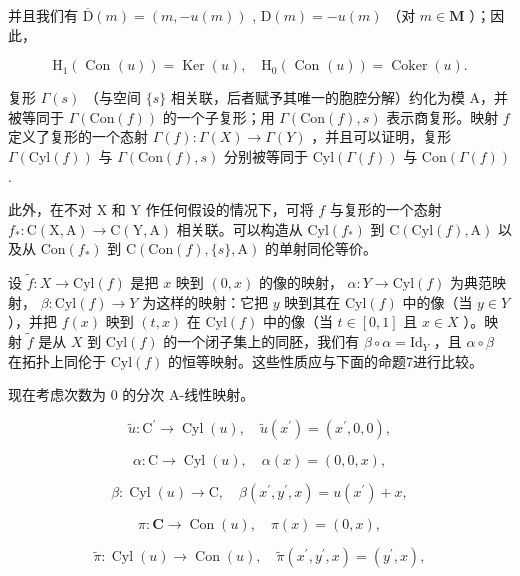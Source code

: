 并且我们有 \(\overline{\mathrm{D}}(m) = (m, -u(m))\) , \(\mathrm{D}(m) = -u(m)\) （对 \(m \in \mathbf{M}\) ）；因此，

\[
\mathrm{H} _ {1} (\text { Con } (u)) = \operatorname{Ker} (u), \quad \mathrm{H} _ {0} (\text { Con } (u)) = \operatorname{Coker} (u).
\]

复形 \(\Gamma(s)\) （与空间 \(\{s\}\) 相关联，后者赋予其唯一的胞腔分解）约化为模 A，并被等同于 \(\Gamma(\text{Con}(f))\) 的一个子复形；用 \(\Gamma(\text{Con}(f), s)\) 表示商复形。映射 \(f\) 定义了复形的一个态射 \(\Gamma(f): \Gamma(X) \to \Gamma(Y)\) ，并且可以证明，复形 \(\Gamma(\text{Cyl}(f))\) 与 \(\Gamma(\text{Con}(f), s)\) 分别被等同于 \(\text{Cyl}(\Gamma(f))\) 与 \(\text{Con}(\Gamma(f))\) .

此外，在不对 X 和 Y 作任何假设的情况下，可将 \(f\) 与复形的一个态射 \(f_{*}: \mathrm{C}(\mathrm{X}, \mathrm{A}) \to \mathrm{C}(\mathrm{Y}, \mathrm{A})\) 相关联。可以构造从 \(\mathrm{Cyl}(f_{*})\) 到 \(\mathrm{C}(\mathrm{Cyl}(f), \mathrm{A})\) 以及从 \(\mathrm{Con}(f_{*})\) 到 \(\mathrm{C}(\mathrm{Con}(f), \{s\}, \mathrm{A})\) 的单射同伦等价。

设 \(\tilde{f}: X \to \text{Cyl}(f)\) 是把 \(x\) 映到 \((0, x)\) 的像的映射， \(\alpha: Y \to \text{Cyl}(f)\) 为典范映射， \(\beta: \text{Cyl}(f) \to Y\) 为这样的映射：它把 \(y\) 映到其在 \(\text{Cyl}(f)\) 中的像（当 \(y \in Y\) ），并把 \(f(x)\) 映到 \((t, x)\) 在 \(\text{Cyl}(f)\) 中的像（当 \(t \in [0, 1]\) 且 \(x \in X\) ）。映射 \(\tilde{f}\) 是从 \(X\) 到 \(\text{Cyl}(f)\) 的一个闭子集上的同胚，我们有 \(\beta \circ \alpha = \text{Id}_Y\) ，且 \(\alpha \circ \beta\) 在拓扑上同伦于 \(\text{Cyl}(f)\) 的恒等映射。这些性质应与下面的命题7进行比较。

现在考虑次数为 0 的分次 A-线性映射。

\[
\tilde {u}: \mathrm{C} ^ {\prime} \rightarrow \operatorname{Cyl} (u), \quad \tilde {u} (x ^ {\prime}) = (x ^ {\prime}, 0, 0),
\]

\[
\alpha : \mathrm{C} \rightarrow \operatorname{Cyl} (u), \quad \alpha (x) = (0, 0, x),
\]

\[
\beta : \operatorname{Cyl} (u) \rightarrow \mathrm{C}, \quad \beta \left(x ^ {\prime}, y ^ {\prime}, x\right) = u \left(x ^ {\prime}\right) + x,
\]

\[
\pi : \mathbf {C} \rightarrow \operatorname{Con} (u), \quad \pi (x) = (0, x),
\]

\[
\tilde {\pi}: \operatorname{Cyl} (u) \to \operatorname{Con} (u), \quad \tilde {\pi} (x ^ {\prime}, y ^ {\prime}, x) = (y ^ {\prime}, x),
\]

